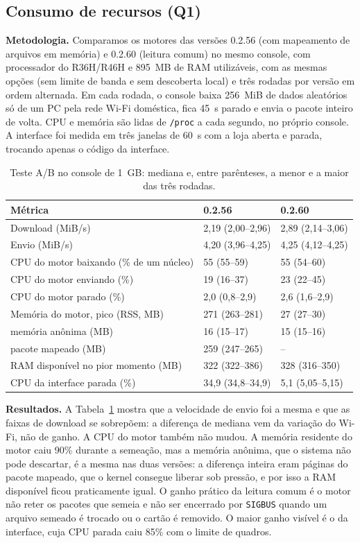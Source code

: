 \documentclass[12pt]{article}
\begin{document}
\subsection{Consumo de recursos (Q1)}
\label{sec:recursos}

\textbf{Metodologia.} Comparamos os motores das versões 0.2.56 (com
mapeamento de arquivos em memória) e 0.2.60 (leitura comum) no mesmo
console, com processador do R36H/R46H e 895~MB de RAM utilizáveis, com as
mesmas opções (sem limite de banda e sem descoberta local) e três rodadas por
versão em ordem alternada. Em cada rodada, o console baixa 256~MiB de dados
aleatórios só de um PC pela rede Wi-Fi doméstica, fica 45~s parado e envia o
pacote inteiro de volta. CPU e memória são lidas de \texttt{/proc} a cada
segundo, no próprio console. A interface foi medida em três janelas de 60~s
com a loja aberta e parada, trocando apenas o código da interface.

\begin{table}[ht]
\centering
\caption{Teste A/B no console de 1~GB: mediana e, entre parênteses, a menor e
a maior das três rodadas.}
\label{tab:ab}
\small
\begin{tabular}{@{}lll@{}}
\toprule
Métrica & 0.2.56 & 0.2.60 \\
\midrule
Download (MiB/s) & 2,19 (2,00--2,96) & 2,89 (2,14--3,06) \\
Envio (MiB/s) & 4,20 (3,96--4,25) & 4,25 (4,12--4,25) \\
CPU do motor baixando (\% de um núcleo) & 55 (55--59) & 55 (54--60) \\
CPU do motor enviando (\%) & 19 (16--37) & 23 (22--45) \\
CPU do motor parado (\%) & 2,0 (0,8--2,9) & 2,6 (1,6--2,9) \\
Memória do motor, pico (RSS, MB) & 271 (263--281) & 27 (27--30) \\
\quad memória anônima (MB) & 16 (15--17) & 15 (15--16) \\
\quad pacote mapeado (MB) & 259 (247--265) & -- \\
RAM disponível no pior momento (MB) & 322 (322--386) & 328 (316--350) \\
CPU da interface parada (\%) & 34,9 (34,8--34,9) & 5,1 (5,05--5,15) \\
\bottomrule
\end{tabular}
\end{table}

\textbf{Resultados.} A Tabela~\ref{tab:ab} mostra que a velocidade de envio
foi a mesma e que as faixas de download se sobrepõem: a diferença de
mediana vem da variação do Wi-Fi, não de ganho. A CPU do motor também não
mudou. A memória residente do motor caiu 90\% durante a semeação, mas a
memória anônima, que o sistema não pode descartar, é a mesma nas duas
versões: a diferença inteira eram páginas do pacote mapeado, que o kernel
consegue liberar sob pressão, e por isso a RAM disponível ficou
praticamente igual. O ganho prático da leitura comum é o motor não reter os
pacotes que semeia e não ser encerrado por \texttt{SIGBUS} quando um arquivo
semeado é trocado ou o cartão é removido. O maior ganho visível é o da
interface, cuja CPU parada caiu 85\% com o limite de quadros.
\end{document}
